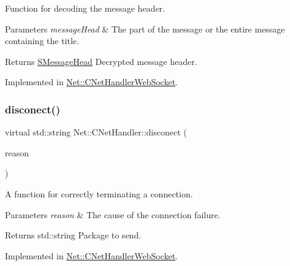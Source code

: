 Function for decoding the message header. 


\begin{DoxyParams}{Parameters}
{\em message\+Head} & The part of the message or the entire message containing the title. \\
\hline
\end{DoxyParams}
\begin{DoxyReturn}{Returns}
\mbox{\hyperlink{struct_net_1_1_s_message_head}{S\+Message\+Head}} Decrypted message header. 
\end{DoxyReturn}


Implemented in \mbox{\hyperlink{class_net_1_1_c_net_handler_web_socket_a26a43acb16b7879df22aa3ce3fc1d172}{Net\+::\+C\+Net\+Handler\+Web\+Socket}}.

\mbox{\label{class_net_1_1_c_net_handler_a1f43099b8631032d4555a326dd71f4d1}} 
\subsubsection{\texorpdfstring{disconect()}{disconect()}}
{\footnotesize\ttfamily virtual std\+::string Net\+::\+C\+Net\+Handler\+::disconect (\begin{DoxyParamCaption}\item[{Disconnect\+Reason}]{reason }\end{DoxyParamCaption})\hspace{0.3cm}{\ttfamily [pure virtual]}}



A function for correctly terminating a connection. 


\begin{DoxyParams}{Parameters}
{\em reason} & The cause of the connection failure. \\
\hline
\end{DoxyParams}
\begin{DoxyReturn}{Returns}
std\+::string Package to send. 
\end{DoxyReturn}


Implemented in \mbox{\hyperlink{class_net_1_1_c_net_handler_web_socket_ac5a2c812c7a1fdb426265a4590409ae3}{Net\+::\+C\+Net\+Handler\+Web\+Socket}}.

\mbox{\label{class_net_1_1_c_net_handler_a6d0a79a8fc8126f6bf90e348c90152a7}} 

